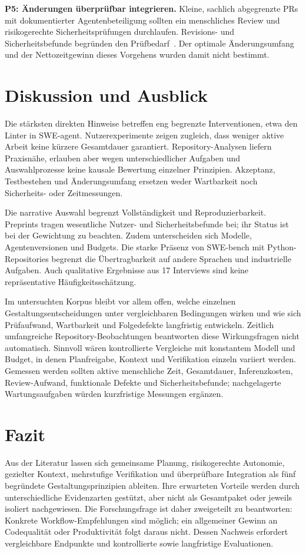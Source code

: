\documentclass[conference]{IEEEtran}
\begin{document}
\textbf{P5: Änderungen überprüfbar integrieren.}
Kleine, sachlich abgegrenzte PRs mit dokumentierter Agentenbeteiligung sollten ein menschliches Review und risikogerechte Sicherheitsprüfungen durchlaufen. Revisions- und Sicherheitsbefunde begründen den Prüfbedarf~\cite{watanabe2025agenticprs,sajadi2025patchsecurity}. Der optimale Änderungsumfang und der Nettozeitgewinn dieses Vorgehens wurden damit nicht bestimmt.

\balance
\section{Diskussion und Ausblick}
Die stärksten direkten Hinweise betreffen eng begrenzte Interventionen, etwa den Linter in SWE-agent. Nutzerexperimente zeigen zugleich, dass weniger aktive Arbeit keine kürzere Gesamtdauer garantiert. Repository-Analysen liefern Praxisnähe, erlauben aber wegen unterschiedlicher Aufgaben und Auswahlprozesse keine kausale Bewertung einzelner Prinzipien. Akzeptanz, Testbestehen und Änderungsumfang ersetzen weder Wartbarkeit noch Sicherheits- oder Zeitmessungen.

Die narrative Auswahl begrenzt Vollständigkeit und Reproduzierbarkeit. Preprints tragen wesentliche Nutzer- und Sicherheitsbefunde bei; ihr Status ist bei der Gewichtung zu beachten. Zudem unterscheiden sich Modelle, Agentenversionen und Budgets. Die starke Präsenz von SWE-bench mit Python-Repositories begrenzt die Übertragbarkeit auf andere Sprachen und industrielle Aufgaben. Auch qualitative Ergebnisse aus 17 Interviews sind keine repräsentative Häufigkeitsschätzung.

Im untersuchten Korpus bleibt vor allem offen, welche einzelnen Gestaltungsentscheidungen unter vergleichbaren Bedingungen wirken und wie sich Prüfaufwand, Wartbarkeit und Folgedefekte langfristig entwickeln. Zeitlich umfangreiche Repository-Beobachtungen beantworten diese Wirkungsfragen nicht automatisch. Sinnvoll wären kontrollierte Vergleiche mit konstantem Modell und Budget, in denen Planfreigabe, Kontext und Verifikation einzeln variiert werden. Gemessen werden sollten aktive menschliche Zeit, Gesamtdauer, Inferenzkosten, Review-Aufwand, funktionale Defekte und Sicherheitsbefunde; nachgelagerte Wartungsaufgaben würden kurzfristige Messungen ergänzen.

\section{Fazit}
Aus der Literatur lassen sich gemeinsame Planung, risikogerechte Autonomie, gezielter Kontext, mehrstufige Verifikation und überprüfbare Integration als fünf begründete Gestaltungsprinzipien ableiten. Ihre erwarteten Vorteile werden durch unterschiedliche Evidenzarten gestützt, aber nicht als Gesamtpaket oder jeweils isoliert nachgewiesen. Die Forschungsfrage ist daher zweigeteilt zu beantworten: Konkrete Workflow-Empfehlungen sind möglich; ein allgemeiner Gewinn an Codequalität oder Produktivität folgt daraus nicht. Dessen Nachweis erfordert vergleichbare Endpunkte und kontrollierte sowie langfristige Evaluationen.
\end{document}
